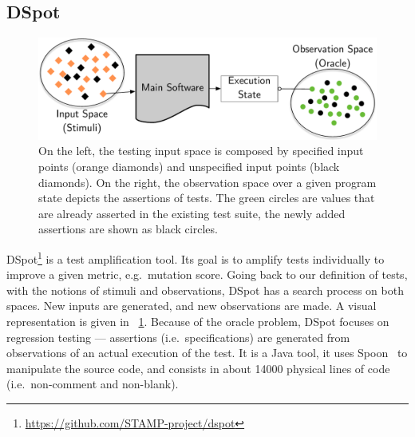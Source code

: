 \documentclass[a4paper,11pt]{sdm_internship}
\newcommand{\addref}[1]{\colorbox{TealBlue!100}{\textcolor{white}{\textbf{$[$\ifx&#1&\ \else#1\fi$]$}}}}
\newcommand{\dspot}{DSpot\xspace}
\theoremstyle{definition}
\begin{document}
\subsection{\dspot{}}%
\label{ssec:dspot}

\begin{figure}
  \centering
  \includegraphics[width=36em]{spaces_report}
  \caption{On the left, the testing input space is composed by specified input points (orange diamonds) and unspecified input points (black diamonds). On the right, the observation space over a given program state depicts the assertions of tests. The green circles are values that are already asserted in the existing test suite, the newly added assertions are shown as black circles.}%
\label{fig:spaces}
\end{figure}

\dspot{}\footnote{\url{https://github.com/STAMP-project/dspot}}\cite{baudry2015automatic,baudry2014tailored,baudry2015dspot} is a test amplification tool.
Its goal is to amplify tests individually to improve a given metric, e.g.\ mutation score.
Going back to our definition of tests, with the notions of stimuli and observations, \dspot{} has a search process on both spaces.
New inputs are generated, and new observations are made.
A visual representation is given in \figurename~\ref{fig:spaces}.
Because of the oracle problem, \dspot{} focuses on regression testing --- assertions (i.e.\ specifications) are generated from observations of an actual execution of the test.
It is a Java tool, it uses Spoon~\cite{pawlak2016spoon} to manipulate the source code, and consists in about 14000 physical lines of code (i.e.\ non-comment and non-blank).
\end{document}
